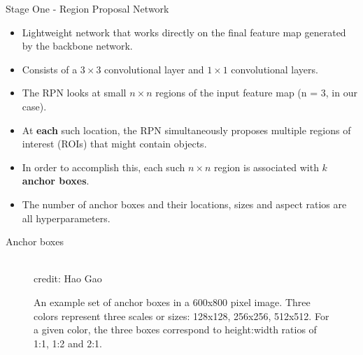 \begin{frame} {Stage One - Region Proposal Network}
  \begin{itemize}
    \item Lightweight network that works directly on the final feature map generated by the backbone network.
    \item Consists of a $3 \times 3$ convolutional layer and $1 \times 1$ convolutional layers.
    \item The RPN looks at small $n \times n$ regions of the input feature map (n = 3, in our case).
    \item At \textbf{each} such location, the RPN simultaneously proposes multiple regions of interest (ROIs) that might contain objects.
    \item In order to accomplish this, each such $n \times n$ region is associated with $k$ \textbf{anchor boxes}.
    \item The number of anchor boxes and their locations, sizes and aspect ratios are all hyperparameters.
  \end{itemize}
\end{frame}

\begin{frame} {Anchor boxes}
  \begin{figure}
    \centering
      \tiny{\\credit: Hao Gao}
      \caption{An example set of anchor boxes in a 600x800 pixel image. Three colors represent three scales or sizes: 128x128, 256x256, 512x512. For a given color, the three boxes correspond to height:width ratios of 1:1, 1:2 and 2:1. }
  \end{figure}
\end{frame}

